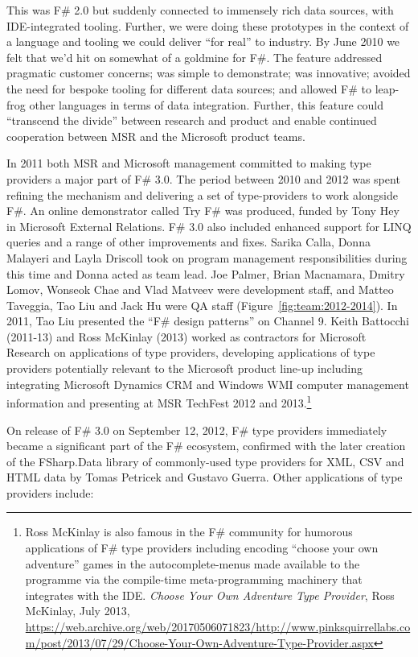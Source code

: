 \documentclass[acmsmall]{acmart}\settopmatter{}
\begin{document}
\begin{figure}
\end{figure}


This was F\# 2.0 but suddenly connected to immensely rich data sources, with IDE-integrated tooling.  Further, we were
doing these prototypes in the context of a language and tooling we could deliver “for real” to industry.  By June 2010 we
felt that we’d hit on somewhat of a goldmine for F\#. The feature addressed pragmatic customer concerns; was simple to
demonstrate; was innovative; avoided the need for bespoke tooling for different data sources; and allowed F\# to leap-frog
other languages in terms of data integration. Further, this feature could “transcend the divide” between research and product
and enable continued cooperation between MSR and the Microsoft product teams. 

In 2011 both MSR and Microsoft management committed to making type providers a major part of F\# 3.0. The period
between 2010 and 2012 was spent refining the mechanism and delivering a set of type-providers to work alongside F\#.
An online demonstrator called Try F\# was produced, funded by Tony Hey in Microsoft External Relations. F\# 3.0 also
included enhanced support for LINQ queries and a range of other improvements and fixes. Sarika Calla, Donna Malayeri
and Layla Driscoll took on program management responsibilities during this time and Donna acted as team lead.  Joe Palmer, Brian Macnamara, Dmitry
Lomov, Wonseok Chae and Vlad Matveev were development staff, and Matteo Taveggia, Tao Liu and
Jack Hu were QA staff (Figure~\ref{fig:team:2012-2014}). In 2011, Tao Liu presented the “F\# design patterns” on Channel 9.
Keith Battocchi (2011-13) and Ross McKinlay (2013) worked as contractors for Microsoft Research on applications of type
providers, developing applications of type providers potentially relevant to the Microsoft product line-up including integrating
Microsoft Dynamics CRM and Windows WMI computer management information and presenting at MSR TechFest 2012 and
2013.\footnote{Ross McKinlay is also famous in the F\# community for humorous applications of F\# type providers
including encoding “choose your own adventure” games in the autocomplete-menus made available to the programme
via the compile-time meta-programming machinery that integrates with the IDE. \textit{Choose Your Own Adventure
Type Provider}, Ross McKinlay, July 2013, \url{https://web.archive.org/web/20170506071823/http://www.pinksquirrellabs.com/post/2013/07/29/Choose-Your-Own-Adventure-Type-Provider.aspx}}

On release of F\# 3.0 on September 12, 2012,  F\# type providers immediately became a significant part of the F\# ecosystem, confirmed with the later creation of the FSharp.Data library of commonly-used type providers for XML, CSV and HTML data by Tomas Petricek and Gustavo Guerra.  Other applications of type providers include:
\end{document}
